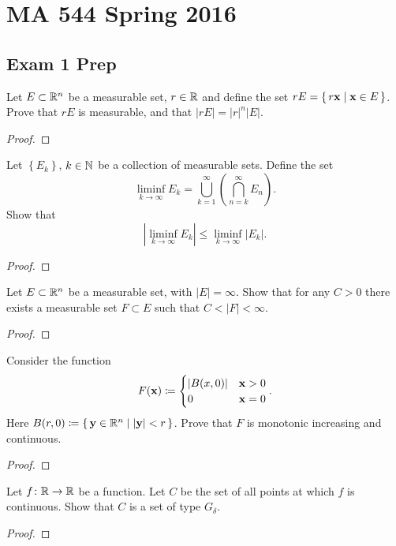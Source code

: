 \chapter{MA 544 Spring 2016}
\section{Exam 1 Prep}
\begin{problem}
Let $E\subset\mathbb{R}^n$ be a measurable set, $r\in\mathbb{R}$ and define the set
$rE=\left\{\,r\mathbf{x}\;\middle|\;\mathbf{x}\in E\,\right\}$. Prove that $rE$ is
measurable, and that $|rE|=|r|^n|E|$.
\end{problem}
\begin{proof}
\end{proof}

\begin{problem}
Let $\left\{ E_k \right\}$, $k\in\mathbb{N}$ be a collection of measurable
sets. Define the set
\[
\liminf_{k\to\infty} E_k=\bigcup_{k=1}^\infty\left(\bigcap_{n=k}^\infty
  E_n\right).
\]
Show that
\[
\left|\liminf_{k\to\infty} E_k\right|\leq\liminf_{k\to\infty}\left|E_k\right|.
\]
\end{problem}
\begin{proof}
\end{proof}

\begin{problem}
Let $E\subset\mathbb{R}^n$ be a measurable set, with $|E|=\infty$. Show that for
any $C>0$ there exists a measurable set $F\subset E$ such that
$C<|F|<\infty$.
\end{problem}
\begin{proof}
\end{proof}

\begin{problem}
Consider the function
\[
F(\mathbf{x})\coloneqq
\begin{cases}
|B(x,0)|&\mathbf{x}>0\\
0&\mathbf{x}=0
\end{cases}.
\]
Here
$B(r,0)\coloneqq\left\{\,\mathbf{y}\in\mathbb{R}^n\;\middle|\;|\mathbf{y}|<r\,\right\}$. Prove
that $F$ is monotonic increasing and continuous.
\end{problem}
\begin{proof}
\end{proof}

\begin{problem}
Let $f\colon\mathbb{R}\to\mathbb{R}$ be a function. Let $C$ be the set of all points
at which $f$ is continuous. Show that $C$ is a set of type $G_\delta$.
\end{problem}
\begin{proof}
\end{proof}

